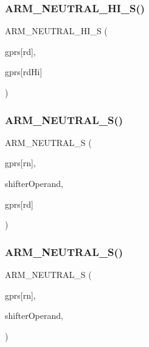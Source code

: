 \subsubsection{\texorpdfstring{A\+R\+M\+\_\+\+N\+E\+U\+T\+R\+A\+L\+\_\+\+H\+I\+\_\+\+S()}{ARM\_NEUTRAL\_HI\_S()}}
{\footnotesize\ttfamily A\+R\+M\+\_\+\+N\+E\+U\+T\+R\+A\+L\+\_\+\+H\+I\+\_\+S (\begin{DoxyParamCaption}\item[{cpu-\/$>$}]{gprs\mbox{[}rd\mbox{]},  }\item[{cpu-\/$>$}]{gprs\mbox{[}rd\+Hi\mbox{]} }\end{DoxyParamCaption})}

\mbox{\label{isa-arm_8c_aea26134277c8c63d00271a624ce54724}} 
\subsubsection{\texorpdfstring{A\+R\+M\+\_\+\+N\+E\+U\+T\+R\+A\+L\+\_\+\+S()}{ARM\_NEUTRAL\_S()}\hspace{0.1cm}{\footnotesize\ttfamily [1/2]}}
{\footnotesize\ttfamily A\+R\+M\+\_\+\+N\+E\+U\+T\+R\+A\+L\+\_\+S (\begin{DoxyParamCaption}\item[{cpu-\/$>$}]{gprs\mbox{[}rn\mbox{]},  }\item[{cpu-\/$>$}]{shifter\+Operand,  }\item[{cpu-\/$>$}]{gprs\mbox{[}rd\mbox{]} }\end{DoxyParamCaption})}

\mbox{\label{isa-arm_8c_ae0c54b99e326604c0849bad3030d8066}} 
\subsubsection{\texorpdfstring{A\+R\+M\+\_\+\+N\+E\+U\+T\+R\+A\+L\+\_\+\+S()}{ARM\_NEUTRAL\_S()}\hspace{0.1cm}{\footnotesize\ttfamily [2/2]}}
{\footnotesize\ttfamily A\+R\+M\+\_\+\+N\+E\+U\+T\+R\+A\+L\+\_\+S (\begin{DoxyParamCaption}\item[{cpu-\/$>$}]{gprs\mbox{[}rn\mbox{]},  }\item[{cpu-\/$>$}]{shifter\+Operand,  }\item[{\mbox{\hyperlink{isa-arm_8c_abb37005c27e4a13f1e19fb44cb8288cb}{alu\+Out}}}]{ }\end{DoxyParamCaption})}

